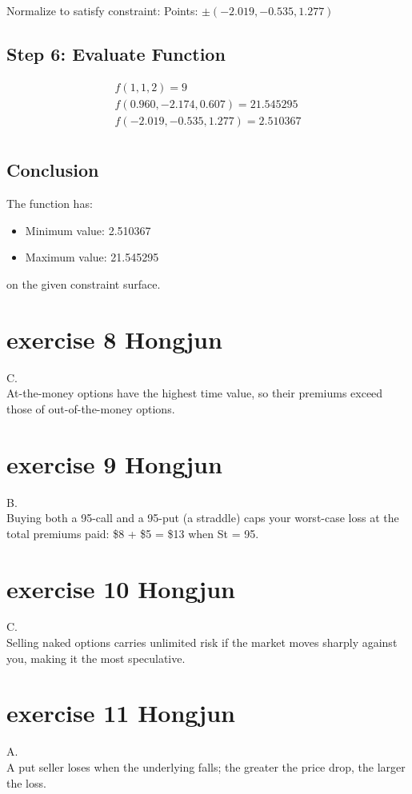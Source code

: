 \documentclass{article}
\begin{document}
Normalize to satisfy constraint:
Points: $\pm(-2.019, -0.535, 1.277)$

\subsection*{Step 6: Evaluate Function}
\begin{align*}
    f(1,1,2) = 9                        \\
    f(0.960, -2.174, 0.607) = 21.545295 \\
    f(-2.019, -0.535, 1.277) = 2.510367 \\
\end{align*}

\subsection*{Conclusion}
The function has:
\begin{itemize}
    \item Minimum value: 2.510367
    \item Maximum value: 21.545295
\end{itemize}
on the given constraint surface.


\section{exercise 8 Hongjun}
C.\\
At-the-money options have the highest time value, so their premiums exceed those of out-of-the-money options.

\section{exercise 9 Hongjun}
B.\\
Buying both a 95-call and a 95-put (a straddle) caps your worst-case loss at the total premiums paid: \$8 + \$5 = \$13 when St = 95.

\section{exercise 10 Hongjun}
C.\\
Selling naked options carries unlimited risk if the market moves sharply against you, making it the most speculative.

\section{exercise 11 Hongjun}
A.\\
A put seller loses when the underlying falls; the greater the price drop, the larger the loss.
\end{document}
